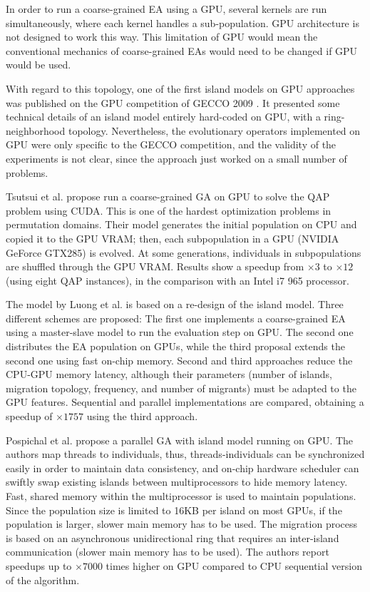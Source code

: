 \documentclass[review]{elsarticle}
\begin{document}
In order to run a coarse-grained EA using a GPU, several kernels are run simultaneously, where each kernel handles a sub-population. GPU architecture is not designed to work this way. This limitation of GPU would mean the conventional mechanics of coarse-grained EAs would need to be changed if GPU would be used.

With regard to this topology, one of the first island models on GPU approaches was published on the GPU competition of GECCO 2009 \cite{gecco2009CompetitionPospichal}. It presented some technical details of an island model entirely hard-coded on GPU, with a ring-neighborhood topology. Nevertheless, the evolutionary operators implemented on GPU were only specific to the GECCO competition, and the validity of the experiments is not clear, since the approach just worked on a small number of problems.

Tsutsui et al. \cite{1570355} propose run a coarse-grained GA on GPU to solve the QAP problem using CUDA. This is one of the hardest optimization problems in permutation domains. 
Their model generates the initial population on CPU and copied it to the GPU VRAM; then, each subpopulation in a GPU (NVIDIA GeForce GTX285) is evolved. At some generations, individuals in subpopulations are shuffled through the GPU VRAM. Results show a speedup from $\times3$ to $\times12$ (using eight QAP instances), in the comparison with an Intel i7 965 processor. 

The model by Luong et al. \cite{LUONG:2010:INRIA-00520464:1} is based on a re-design of the island model.
Three different schemes are proposed: The first one implements a coarse-grained EA using a master-slave model to run the evaluation step on GPU. The second one distributes the EA population on GPUs, while the third proposal extends the second one using fast on-chip memory. 
Second and third approaches reduce the CPU-GPU memory latency, although their parameters (number of islands, migration topology, frequency, and number of migrants) must be adapted to the GPU features. 
Sequential and parallel implementations are compared, obtaining a speedup of $\times1757$ using the third approach.

Pospichal et al. \cite{pospichalParallelGeneticAlgorithOnCUDA2010,9253} propose a parallel GA with island model running on GPU. The authors map threads to individuals, thus, threads-individuals can be synchronized easily in order to maintain data consistency, and on-chip hardware scheduler can swiftly swap existing islands between multiprocessors to hide memory latency. Fast, shared memory within the multiprocessor is used to maintain populations.
Since the population size is limited to 16KB per island on most GPUs, if the population is larger, slower main memory has to be used. The migration process is based on an asynchronous unidirectional ring that requires an inter-island communication (slower main memory has to be used). The authors report speedups up to $\times7000$ times higher on GPU compared to CPU sequential version of the algorithm.
\end{document}
